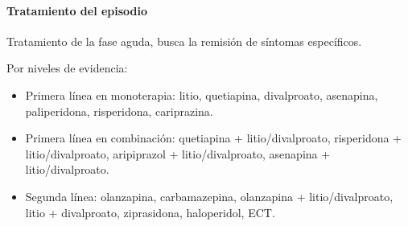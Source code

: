 \paragraph{Tratamiento del episodio}
Tratamiento de la fase aguda, busca la remisión de síntomas específicos.

Por niveles de evidencia:
\begin{itemize}
	\item Primera línea en monoterapia: litio, quetiapina, divalproato, asenapina, paliperidona, risperidona, cariprazina.
	\item Primera línea en combinación: quetiapina + litio/divalproato, risperidona + litio/divalproato, aripiprazol + litio/divalproato, asenapina + litio/divalproato.
	\item Segunda línea: olanzapina, carbamazepina, olanzapina + litio/divalproato, litio + divalproato, ziprasidona, haloperidol, ECT.
\end{itemize}

